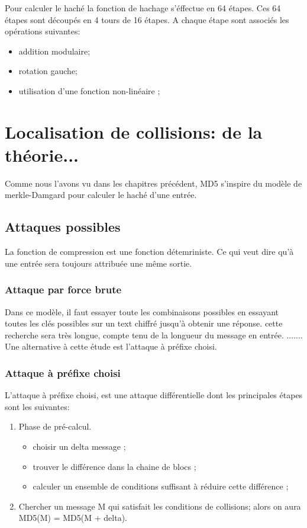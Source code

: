\documentclass[a4paper,11pt,french]{article}
\begin{document}
Pour calculer le haché la fonction de hachage s'éffectue en 64 étapes. Ces 64 étapes sont découpés en 4 tours de 16 étapes. A chaque étape sont associés les opérations suivantes:
\begin{itemize}
\item addition modulaire;
\item rotation gauche;
\item utilisation d'une fonction non-linéaire ;
\end{itemize}


\section{Localisation de collisions: de la théorie...}
Comme nous l'avons vu dans les chapitres précédent, MD5 s'inspire du modèle de merkle-Damgard pour calculer le haché d'une entrée.

\subsection{Attaques possibles}
La fonction de compression est une fonction détemriniste. Ce qui veut dire qu'à une entrée sera toujours attribuée une même sortie. 

\subsubsection{Attaque par force brute}
Dans ce modèle, il faut essayer toute les combinaisons possibles en essayant toutes les clés possibles sur un text chiffré jusqu'à obtenir une réponse. cette recherche sera très longue, compte tenu de la longueur du message en entrée. .......\\
Une alternative à cette étude est l'attaque à préfixe choisi.


\subsubsection{Attaque à préfixe choisi}

L'attaque à préfixe choisi, est une attaque différentielle dont les principales étapes sont les suivantes:
\begin {enumerate}
 \item Phase de pré-calcul.
 \begin{itemize}
  \item choisir un delta message ;
  \item trouver le différence dans la chaine de blocs ;
  \item calculer un ensemble de conditions suffisant à réduire cette différence ;
 \end{itemize}
 \item Chercher un message M qui satisfait les conditions de collisions; alors on aura MD5(M) = MD5(M + delta).
\end{enumerate}
\end{document}
